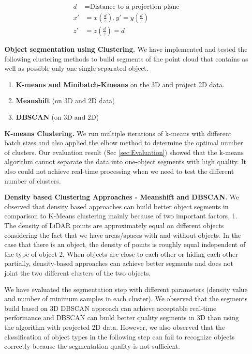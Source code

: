 \begin{align*}
d  & = \text{Distance to a projection plane} \\
x' & =  x (\frac{d}{z})  ,  y' =  y (\frac{d}{z}) \\
z' & =  z (\frac{d}{z}) = d
\end{align*}

\textbf{Object segmentation using Clustering.} We have implemented and tested the following clustering methods to build segments of the point cloud 
that contains as well as possible only one single separated object.

\begin{enumerate}
  \item \textbf{K-means and Minibatch-Kmeans} on the 3D and project 2D data.
  \item \textbf{Meanshift} (on 3D and 2D data)
  \item \textbf{DBSCAN}  (on 3D and 2D)
\end{enumerate}

\textbf{K-means Clustering.} We run multiple iterations of k-means with different batch sizes and also applied the elbow method to determine the optimal
 number of clusters.
Our evaluation result (Sec \ref{sec:Evaluation}) showed that the k-means algorithm cannot separate the data into one-object segments with high quality. 
It also could not achieve real-time processing when we need to test the different number of clusters.

\textbf{Density based Clustering Approaches - Meanshift and DBSCAN.} We observed that density based approaches can build better object segments 
in comparison to K-Means clustering mainly because of two important factors, 1. The density of LiDAR points are approximately equal on different 
objects considering the fact that we have areas/spaces with and without objects. In the case that there is an object, the density of points is 
roughly equal independent of the type of object 2. When objects are close to each other or hiding each other partially, density-based approaches 
can achieve better segments and does not joint the two different clusters of the two objects.

We have evaluated the segmentation step with different parameters (density value and number of minimum samples in each cluster). 
We observed that the segments build based on 3D DBSCAN approach can achieve acceptable real-time performance and  DBSCAN can build better 
quality segments in 3D than using the algorithm with projected 2D data. However, we also observed that the classification of object types 
in the following step can fail to recognize objects correctly because the segmentation quality is not sufficient.


